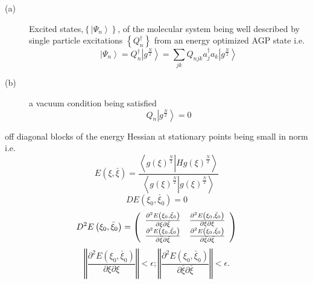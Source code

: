 \documentclass[aps,preprint]{revtex4}%
\begin{document}
\begin{description}
\item[(a)] Excited states,$\left\{  \left\vert \Psi_{n}\right\rangle \right\}
$, of the molecular system being well described by single particle excitations
$\left\{  Q_{n}^{\dagger}\right\}  $ from an energy optimized AGP state i.e.%
\begin{equation}
\left\vert \Psi_{n}\right\rangle =Q_{n}^{\dagger}\left\vert g^{\frac{N}{2}%
}\right\rangle =\sum_{jk}Q_{njk}a_{j}^{\dagger}a_{k}\left\vert g^{\frac{N}{2}%
}\right\rangle
\end{equation}


\item[(b)] a vacuum condition being satisfied%
\begin{equation}
Q_{n}\left\vert g^{\frac{N}{2}}\right\rangle =0
\end{equation}

\end{description}

off diagonal blocks of the energy Hessian at stationary points being small in
norm i.e.%
\begin{equation}
E\left(  \xi,\bar{\xi}\right)  =\frac{\left\langle \left.  g\left(
\xi\right)  ^{\frac{N}{2}}\right\vert Hg\left(  \xi\right)  ^{\frac{N}{2}%
}\right\rangle }{\left\langle \left.  g\left(  \xi\right)  ^{\frac{N}{2}%
}\right\vert g\left(  \xi\right)  ^{\frac{N}{2}}\right\rangle }%
\end{equation}%
\begin{equation}
DE\left(  \xi_{0},\bar{\xi}_{0}\right)  =0
\end{equation}%
\begin{equation}
D^{2}E\left(  \xi_{0},\bar{\xi}_{0}\right)  =\left(
\begin{array}
[c]{cc}%
\frac{\partial^{2}E\left(  \xi_{0},\bar{\xi}_{0}\right)  }{\partial\xi
\partial\bar{\xi}} & \frac{\partial^{2}E\left(  \xi_{0},\bar{\xi}_{0}\right)
}{\partial\xi\partial\xi}\\
\frac{\partial^{2}E\left(  \xi_{0},\bar{\xi}_{0}\right)  }{\partial\bar{\xi
}\partial\bar{\xi}} & \frac{\partial^{2}E\left(  \xi_{0},\bar{\xi}_{0}\right)
}{\partial\bar{\xi}\partial\bar{\xi}}%
\end{array}
\right)
\end{equation}%
\begin{equation}
\left\Vert \frac{\partial^{2}E\left(  \xi_{0},\bar{\xi}_{0}\right)  }%
{\partial\xi\partial\xi}\right\Vert <\epsilon;\left\Vert \frac{\partial
^{2}E\left(  \xi_{0},\bar{\xi}_{0}\right)  }{\partial\bar{\xi}\partial\bar
{\xi}}\right\Vert <\epsilon.
\end{equation}
\end{document}
